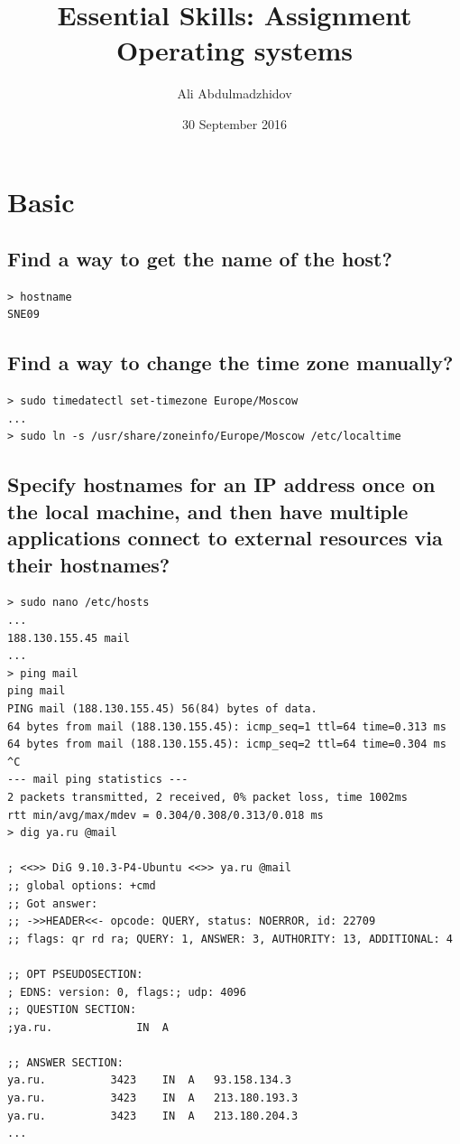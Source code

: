 \documentclass[10pt]{article}
\title{Essential Skills: Assignment Operating systems}
\date{30 September 2016}
\author{Ali Abdulmadzhidov}
\begin{document}
\renewcommand*\rmdefault{cmss}
\maketitle
\section{Basic}
\subsection{Find a way to get the name of the host?}
\begin{verbatim}
> hostname
SNE09
\end{verbatim}
\subsection{Find a way to change the time zone manually?}
\begin{verbatim}
> sudo timedatectl set-timezone Europe/Moscow
...
> sudo ln -s /usr/share/zoneinfo/Europe/Moscow /etc/localtime
\end{verbatim}

\subsection{Specify hostnames for an IP address once on the local machine, and then have multiple applications connect to  external resources via their hostnames?}
\begin{verbatim}
> sudo nano /etc/hosts
...
188.130.155.45 mail
...
> ping mail
ping mail
PING mail (188.130.155.45) 56(84) bytes of data.
64 bytes from mail (188.130.155.45): icmp_seq=1 ttl=64 time=0.313 ms
64 bytes from mail (188.130.155.45): icmp_seq=2 ttl=64 time=0.304 ms
^C
--- mail ping statistics ---
2 packets transmitted, 2 received, 0% packet loss, time 1002ms
rtt min/avg/max/mdev = 0.304/0.308/0.313/0.018 ms
> dig ya.ru @mail

; <<>> DiG 9.10.3-P4-Ubuntu <<>> ya.ru @mail
;; global options: +cmd
;; Got answer:
;; ->>HEADER<<- opcode: QUERY, status: NOERROR, id: 22709
;; flags: qr rd ra; QUERY: 1, ANSWER: 3, AUTHORITY: 13, ADDITIONAL: 4

;; OPT PSEUDOSECTION:
; EDNS: version: 0, flags:; udp: 4096
;; QUESTION SECTION:
;ya.ru.             IN  A

;; ANSWER SECTION:
ya.ru.          3423    IN  A   93.158.134.3
ya.ru.          3423    IN  A   213.180.193.3
ya.ru.          3423    IN  A   213.180.204.3
... 
\end{verbatim}
\end{document}
